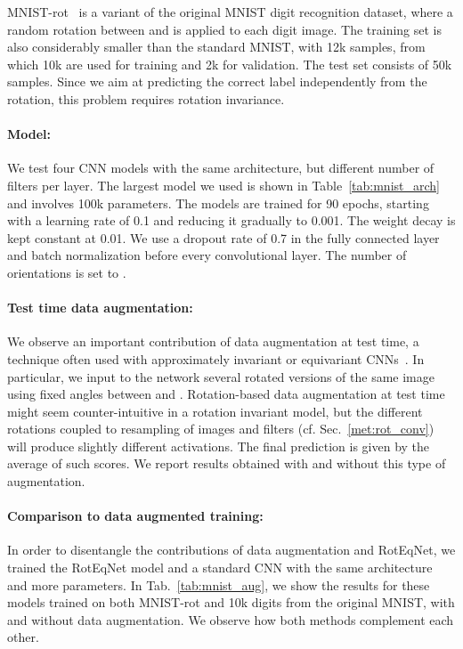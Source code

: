 \documentclass[10pt,twocolumn,letterpaper,table]{article}
\begin{document}
MNIST-rot~\cite{larochelle2007empirical} is a variant of the original MNIST digit recognition dataset, where a random rotation between  and  is applied to each  digit image. The training set is also considerably smaller than the standard MNIST, with 12k samples, from which 10k are used for training and 2k for validation. The test set consists of 50k samples. Since we aim at predicting the correct label independently from the rotation, this problem requires rotation invariance.
	
\paragraph{Model:} We test four CNN models with the same architecture, but different number of filters per layer. The largest model we used is shown in Table~\ref{tab:mnist_arch} and involves 100k parameters. The models are trained for 90 epochs, starting with a learning rate of 0.1 and reducing it gradually to 0.001. The weight decay is kept constant at 0.01. We use a dropout rate of 0.7 in the fully connected layer and batch normalization before every convolutional layer. The number of orientations is set to .
\vspace*{-3mm}
\paragraph{Test time data augmentation:} We observe an important contribution of data augmentation at test time, a technique often used with approximately invariant or equivariant CNNs~\cite{fakhry2016deep,hu2015face}. In particular, we input to the network several rotated versions of the same image using fixed angles between  and . Rotation-based data augmentation at test time might seem counter-intuitive in a rotation invariant model, but the different rotations coupled to resampling of images and filters (cf. Sec.~\ref{met:rot_conv}) will produce slightly different activations. The final prediction is given by the average of such scores. We report results obtained with and without this type of augmentation.
\vspace*{-3mm}

\paragraph{Comparison to data augmented training:} In order to disentangle the contributions of data augmentation and RotEqNet, we trained the RotEqNet model and a standard CNN with the same architecture and  more parameters. In Tab.~\ref{tab:mnist_aug}, we show the results for these models trained on both MNIST-rot and 10k digits from the original MNIST, with and without data augmentation. We observe how both methods complement each other.
\end{document}

